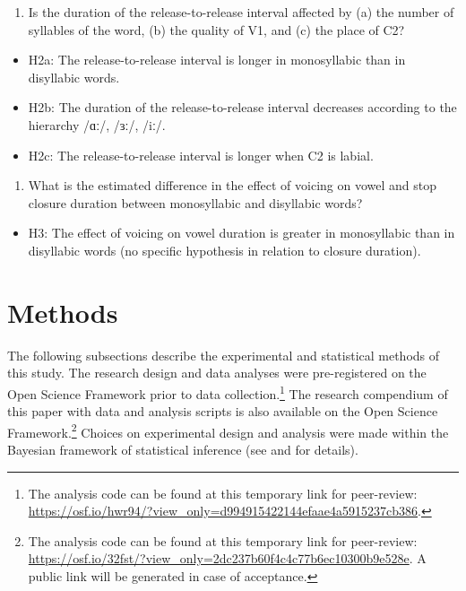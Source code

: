 \documentclass[
  12pt,
  a4paper,
]{article}
\providecommand{\tightlist}{%
  \setlength{\itemsep}{0pt}\setlength{\parskip}{0pt}}
\begin{document}
\begin{enumerate}
\def\labelenumi{\arabic{enumi}.}
\setcounter{enumi}{1}
\tightlist
\item
  Is the duration of the release-to-release interval affected by (a) the
  number of syllables of the word, (b) the quality of V1, and (c) the
  place of C2?
\end{enumerate}

\begin{itemize}
\tightlist
\item
  H2a: The release-to-release interval is longer in monosyllabic than in
  disyllabic words.
\item
  H2b: The duration of the release-to-release interval decreases
  according to the hierarchy /ɑː/, /ɜː/, /iː/.
\item
  H2c: The release-to-release interval is longer when C2 is labial.
\end{itemize}

\begin{enumerate}
\def\labelenumi{\arabic{enumi}.}
\setcounter{enumi}{2}
\tightlist
\item
  What is the estimated difference in the effect of voicing on vowel and
  stop closure duration between monosyllabic and disyllabic words?
\end{enumerate}

\begin{itemize}
\tightlist
\item
  H3: The effect of voicing on vowel duration is greater in monosyllabic
  than in disyllabic words (no specific hypothesis in relation to
  closure duration).
\end{itemize}

\hypertarget{methods}{%
\section{Methods}\label{methods}}

The following subsections describe the experimental and statistical
methods of this study. The research design and data analyses were
pre-registered on the Open Science Framework prior to data
collection.\footnote{The analysis code can be found at this temporary link for peer-review: \url{https://osf.io/hwr94/?view_only=d994915422144efaae4a5915237cb386}.}
The research compendium of this paper with data \citep{coretta2019g} and
analysis scripts is also available on the Open Science
Framework.\footnote{The analysis code can be found at this temporary link for peer-review: \url{https://osf.io/32fst/?view_only=2dc237b60f4c4c77b6ec10300b9e528e}. A public link will be generated in case of acceptance.}
Choices on experimental design and analysis were made within the
Bayesian framework of statistical inference (see 
and  for details).
\end{document}
